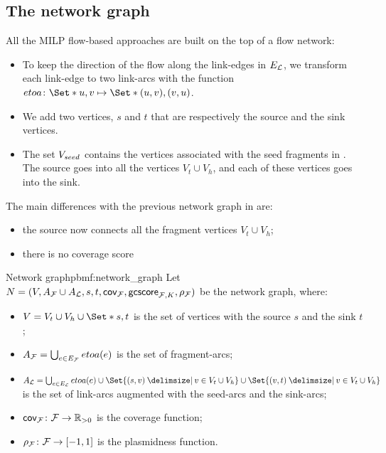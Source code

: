 \subsection{The network graph}\label{sec:pbmf:network}

All the MILP flow-based approaches are built on the top of a flow network:

\begin{itemize}
  \item To keep the direction of the flow along the link-edges in \(E_{\mathcal{L}}{}\), we transform each link-edge to two link-arcs with the function \(etoa \colon \Set*{u, v} \mapsto \Set*{(u, v), (v, u)}\).
  \item We add two vertices, \(s\) and \(t\) that are respectively the source and the sink vertices.
  \item The set \(V_{seed}{}\) contains the vertices associated with the seed fragments in \SeedFrags{}.
    The source goes into all the vertices \(V_t \cup V_h\), and each of these vertices goes into the sink.
\end{itemize}

The main differences with the previous network graph in  are:
\begin{itemize}
  \item the source now connects all the fragment vertices \(V_t \cup V_h\);
  \item there is no coverage score
\end{itemize}

\begin{definition}{Network graph}{pbmf:network_graph}
  Let \(N = (V, A_{\mathcal{F}}{} \cup A_{\mathcal{L}}{}, s, t, \mathsf{cov}_{\mathcal{F}{}}, \mathsf{gcscore}_{\mathcal{F}{}, K}, \rho_{\mathcal{F}{}})\) be the network graph, where:

  \begin{itemize}
    \item \( V = V_t \cup V_h \cup \Set*{s, t} \) is the set of vertices with the source \(s\) and the sink \(t\);
    \item \( A_{\mathcal{F}}{} = \bigcup_{e \in E_{\mathcal{F}}{}} etoa(e) \) is the set of fragment-arcs;
    \item \( A_\Links{} = \bigcup_{e \in E_\Links{}} etoa(e) \cup \Set{(s, v) \given v \in V_t \cup V_h} \cup \Set{(v, t) \given v \in V_t \cup V_h} \) is the set of link-arcs augmented with the seed-arcs and the sink-arcs;
    \item \( \mathsf{cov}_{\mathcal{F}{}} \colon \mathcal{F}{} \to \mathbb{R}{}_{> 0} \) is the coverage function;
    \item \( \rho_{\mathcal{F}{}} \colon \mathcal{F}{} \to [-1, 1] \) is the plasmidness function.
  \end{itemize}
\end{definition}
